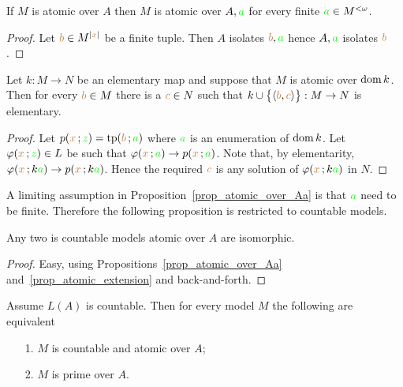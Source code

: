 \documentclass[creche.tex]{subfiles}
\begin{document}
\begin{proposition}\label{prop_atomic_over_Aa}
If $M$ is atomic over $A$ then $M$ is atomic over $A,{\color{green} a}$ for every finite ${\color{green} a}\in M^{<\omega}$.
\end{proposition}
\begin{proof}
Let ${\color{brown} b}\in M^{|{\color{brown} x}|}$ be a finite tuple.
Then $A$ isolates ${\color{brown} b},{\color{green} a}$  hence $A,{\color{green} a}$ isolates ${\color{brown} b}$.
\end{proof}

\begin{proposition}\label{prop_atomic_extension}
Let $k:M\to N$ be an elementary map and suppose that $M$ is atomic over $\mathop{\rm dom} k$.
Then for every ${\color{brown} b}\in M$ there is a ${\color{brown} c}\in N$ such that $k\cup\big\{\langle{\color{brown}b},{\color{brown} c}\rangle\big\}:M\to N$ is elementary.
\end{proposition}

\begin{proof}
Let $p({\color{brown} x}\,;{\color{green} z})={\rm tp}({\color{brown} b}\,;{\color{green} a})$ where ${\color{green} a}$ is an enumeration of $\mathop{\rm dom} k$.
Let $\varphi({\color{brown} x}\,;{\color{green} z})\in L$ be such that $\varphi({\color{brown} x}\,;{\color{green} a})\rightarrow p({\color{brown} x}\,;{\color{green} a})$.
Note that, by elementarity, $\varphi({\color{brown} x}\,;k{\color{green} a})\rightarrow p({\color{brown} x}\,;k{\color{green} a})$.
Hence the required ${\color{brown} c}$ is any solution of $\varphi({\color{brown} x}\,;k{\color{green} a})$ in $N$.
\end{proof}

A limiting assumption in Proposition~\ref{prop_atomic_over_Aa} is that ${\color{green} a}$ need to be finite.
Therefore the following proposition is restricted to countable models.

\begin{proposition}\label{prop_atomic_unique}
Any two is countable models atomic over $A$ are isomorphic.
\end{proposition}

\begin{proof}
Easy, using Propositions~\ref{prop_atomic_over_Aa} and~\ref{prop_atomic_extension} and back-and-forth.
\end{proof}

\begin{proposition} 
Assume $L(A)$ is countable.
Then for every model $M$ the following are equivalent
\begin{itemize}
\item[1.] $M$ is countable and atomic over $A$;
\item[2.] $M$ is prime over $A$.
\end{itemize}
\end{proposition}
\end{document}
